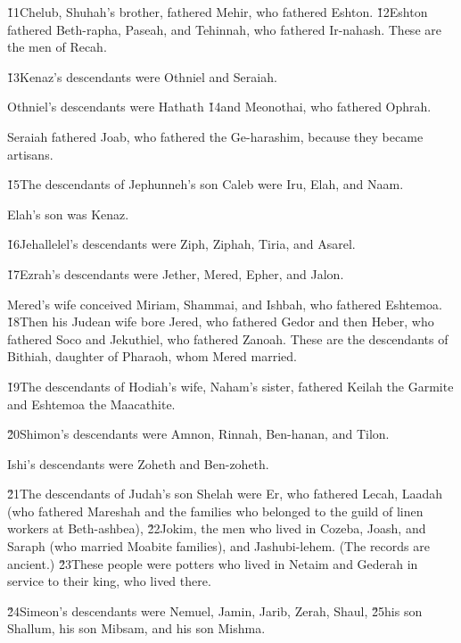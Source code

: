 \v{11}Chelub, Shuhah's brother, fathered Mehir, who fathered Eshton. \v{12}Eshton fathered Beth-rapha, Paseah, and Tehinnah, who fathered Ir-nahash. These are the men of Recah.

\v{13}Kenaz's descendants were Othniel and Seraiah.

Othniel's descendants were Hathath \v{14}and Meonothai, who fathered Ophrah.

Seraiah fathered Joab, who fathered the Ge-harashim, because they became artisans.

\v{15}The descendants of Jephunneh's son Caleb were Iru, Elah, and Naam.

Elah's son was Kenaz.

\v{16}Jehallelel's descendants were Ziph, Ziphah, Tiria, and Asarel.

\v{17}Ezrah's descendants were Jether, Mered, Epher, and Jalon.

Mered's wife conceived Miriam, Shammai, and Ishbah, who fathered Eshtemoa. \v{18}Then his Judean wife bore Jered, who fathered Gedor and then Heber, who fathered Soco and Jekuthiel, who fathered Zanoah. These are the descendants of Bithiah, daughter of Pharaoh, whom Mered married.

\v{19}The descendants of Hodiah's wife, Naham's sister, fathered Keilah the Garmite and Eshtemoa the Maacathite.

\v{20}Shimon's descendants were Amnon, Rinnah, Ben-hanan, and Tilon.

Ishi's descendants were Zoheth and Ben-zoheth.

\v{21}The descendants of Judah's son Shelah were Er, who fathered Lecah, Laadah (who fathered Mareshah and the families who belonged to the guild of linen workers at Beth-ashbea), \v{22}Jokim, the men who lived in Cozeba, Joash, and Saraph (who married Moabite families), and Jashubi-lehem. (The records are ancient.) \v{23}These people were potters who lived in Netaim and Gederah in service to their king, who lived there.

\v{24}Simeon's descendants were Nemuel, Jamin, Jarib, Zerah, Shaul, \v{25}his son Shallum, his son Mibsam, and his son Mishma.

